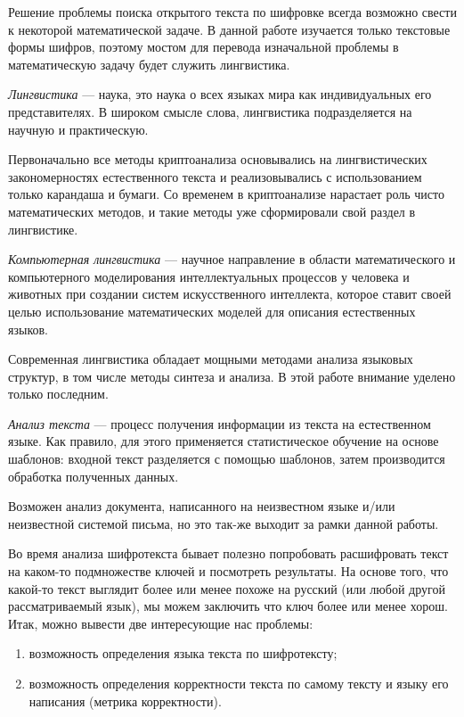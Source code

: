 Решение проблемы поиска открытого текста по шифровке всегда возможно 
свести к некоторой математической задаче. В данной работе
изучается только текстовые формы шифров, поэтому мостом 
для перевода изначальной проблемы в математическую задачу
будет служить лингвистика.

\DEF\textit{Лингвистика} — наука, это наука о 
всех языках мира как индивидуальных его представителях. В широком смысле 
слова, лингвистика подразделяется на научную и практическую.

Первоначально все методы криптоанализа основывались на 
лингвистических закономерностях 
естественного текста и реализовывались с использованием только карандаша 
и бумаги. Со временем в криптоанализе нарастает роль чисто математических 
методов, и такие методы уже сформировали свой раздел в 
лингвистике.

\DEF\textit{Компьютерная лингвистика} — научное направление в области 
математического и компьютерного моделирования интеллектуальных 
процессов у человека и животных 
при создании систем искусственного интеллекта, которое ставит своей целью 
использование математических моделей для описания естественных языков.

Современная лингвистика обладает мощными методами анализа языковых 
структур, в том числе методы синтеза и анализа. В этой работе 
внимание уделено только последним.

\DEF\textit{Анализ текста} — процесс получения информации из текста 
на естественном языке. Как правило, для этого применяется статистическое 
обучение на основе шаблонов: входной текст разделяется с помощью шаблонов,
затем производится обработка полученных данных.

Возможен анализ документа, написанного на неизвестном языке и/или 
неизвестной системой письма, но это так-же выходит за рамки данной работы. 

Во время анализа шифротекста бывает полезно попробовать расшифровать 
текст на каком-то подмножестве ключей и посмотреть результаты.
На основе того, что какой-то текст выглядит более или менее 
похоже на русский (или любой другой рассматриваемый язык), 
мы можем заключить что ключ более или менее хорош.
Итак, можно вывести две интересующие нас проблемы:

\begin{enumerate}
\item возможность определения языка текста по шифротексту;
\item возможность определения корректности текста по самому тексту 
и языку его написания (метрика корректности).
\end{enumerate}

